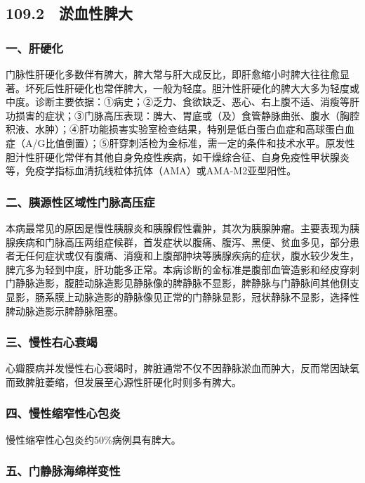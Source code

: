 \subsection{109.2　淤血性脾大}

\subsubsection{一、肝硬化}

门脉性肝硬化多数伴有脾大，脾大常与肝大成反比，即肝愈缩小时脾大往往愈显著。坏死后性肝硬化也常伴脾大，一般为轻度。胆汁性肝硬化的脾大大多为轻度或中度。诊断主要依据：①病史；②乏力、食欲缺乏、恶心、右上腹不适、消瘦等肝功损害的症状；③门脉高压表现：脾大、胃底或（及）食管静脉曲张、腹水（胸腔积液、水肿）；④肝功能损害实验室检查结果，特别是低白蛋白血症和高球蛋白血症（A/G比值倒置）；⑤肝穿刺活检为金标准，需一定的条件和技术水平。原发性胆汁性肝硬化常伴有其他自身免疫性疾病，如干燥综合征、自身免疫性甲状腺炎等，免疫学指标血清抗线粒体抗体（AMA）或AMA-M2亚型阳性。

\subsubsection{二、胰源性区域性门脉高压症}

本病最常见的原因是慢性胰腺炎和胰腺假性囊肿，其次为胰腺肿瘤。主要表现为胰腺疾病和门脉高压两组症候群，首发症状以腹痛、腹泻、黑便、贫血多见，部分患者无任何症状或仅有腹痛、消瘦和上腹部肿块等胰腺疾病的症状，腹水较少发生，脾亢多为轻到中度，肝功能多正常。本病诊断的金标准是腹部血管造影和经皮穿刺门静脉造影，腹腔动脉造影见静脉像的脾静脉不显影，脾静脉与门静脉间其他侧支显影，肠系膜上动脉造影的静脉像见正常的门静脉显影，冠状静脉不显影，选择性脾动脉造影示脾静脉阻塞。

\subsubsection{三、慢性右心衰竭}

心瓣膜病并发慢性右心衰竭时，脾脏通常不仅不因静脉淤血而肿大，反而常因缺氧而致脾脏萎缩，但发展至心源性肝硬化时则多有脾大。

\subsubsection{四、慢性缩窄性心包炎}

慢性缩窄性心包炎约50\%病例具有脾大。

\subsubsection{五、门静脉海绵样变性}

